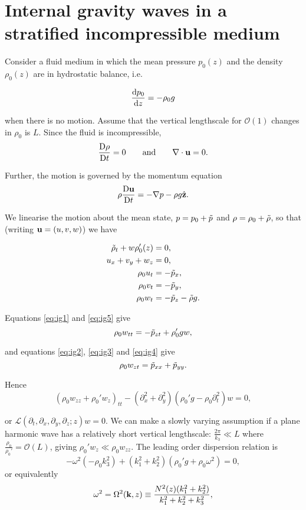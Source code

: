 \documentclass{notes}
\newcommand{\vk}{\vect{k}}
\newcommand{\cO}{\mathcal{O}}
\newcommand{\cL}{\mathcal{L}}
\begin{document}
\section[Internal gravity waves]
{Internal gravity waves in a stratified incompressible medium}

Consider a fluid medium in which the mean pressure $p_0(z)$ and the
density $\rho_0(z)$ are in hydrostatic balance, i.e.

\[
\frac{\mathrm{d} p_0}{\mathrm{d} z} = - \rho_0 g
\]

when there is no motion.  Assume that the vertical lengthscale for
$\cO(1)$ changes in $\rho_0$ is $L$.  Since the fluid is
incompressible,
\[
\frac{\mathrm{D}\rho}{\mathrm{D} t} = 0 \qquad \text{and} \qquad \nabla \cdot \mathbf{u} = 0.
\]

Further, the motion is governed by the momentum equation
\[
\rho \frac{\mathrm{D}\mathbf{u}}{\mathrm{D} t} = - \nabla p - \rho g \Hat{\mathbf{z}}.
\]

We linearise the motion about the mean state, $p = p_0 + \Tilde{p}$
and $\rho = \rho_0 + \Tilde{\rho}$, so that (writing $\mathbf{u} = (u,v,w)$)
we have

\begin{align}
\Tilde{\rho}_t + w \rho_0'(z) &= 0, \label{eq:ig1} \\
u_x + v_y + w_z &= 0, \label{eq:ig2} \\
\rho_0 u_t &= - \Tilde{p}_x, \label{eq:ig3} \\
\rho_0 v_t &= - \Tilde{p}_y, \label{eq:ig4} \\
\rho_0 w_t &= - \Tilde{p}_z - \Tilde{\rho} g. \label{eq:ig5}
\end{align}

Equations \eqref{eq:ig1} and \eqref{eq:ig5} give
\[
\rho_0 w_{tt} = - \Tilde{p}_{zt} + \rho_0' g w, 
\]

and equations \eqref{eq:ig2}, \eqref{eq:ig3} and \eqref{eq:ig4} give
\[
\rho_0 w_{zt} = \Tilde{p}_{xx} + \Tilde{p}_{yy}.
\]

Hence
\[
\left(\rho_0 w_{zz} + \rho_0' w_z \right)_{tt} -
\left(\partial^2_x + \partial^2_y \right) \left( \rho_0' g - \rho_0
  \partial^2_t \right) w = 0,
\]

or $\cL(\partial_t, \partial_x, \partial_y, \partial_z; z) w = 0$.
We can make a slowly varying assumption if a plane harmonic wave has a
relatively short vertical lengthscale: $\tfrac{2 \pi}{k_3} \ll L$
where $\tfrac{\rho_0}{\rho_0'} = \cO(L)$, giving $\rho_0' w_z \ll
\rho_0 w_{zz}$.  The leading order dispersion relation is
\[
- \omega^2 \left( - \rho_0 k_3^2 \right) + (k_1^2 + k_2^2) (\rho_0' g
  + \rho_0 \omega^2) = 0,
\]
or equivalently
\begin{equation}\label{eq:igwdisp}
\omega^2 = \Omega^2(\vk,z) \equiv \frac{N^2(z) (k_1^2 + k_2^2)}{k_1^2 +
  k_2^2 + k_3^2},
\end{equation}
\end{document}
